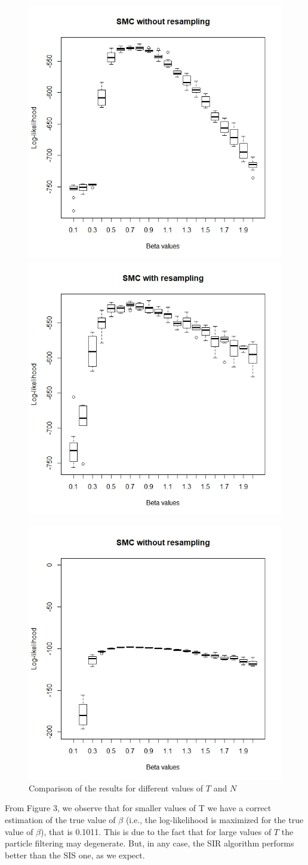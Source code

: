 \documentclass[]{article}
\begin{document}
\begin{figure}
	\begin{center}
		\includegraphics[width=.4\textwidth]{task1/SIS_N_1000_T_500.jpeg}
		\includegraphics[width=.4\textwidth]{task1/SIR_N_1000_T_500.jpeg}
		\caption*{$N=1000$ and $T=500$}
		\caption*{$N=100$ and $T=100$}
		\includegraphics[width=.4\textwidth]{task1/SIS_N_1000_T_100.jpeg}
		\caption*{$N=1000$ and $T=100$}
	\end{center}
	\caption{Comparison of the results for different values of $T$ and $N$}
\end{figure}

From Figure 3, we observe that for smaller values of T we have a correct estimation of the true value of $\beta$ (i.e., the log-likelihood is maximized for the true value of $\beta$), that is 0.1011. This is due to the fact that for large values of $T$ the particle filtering may degenerate. But, in any case, the SIR algorithm performs better than the SIS one, as we expect. 
\end{document}
